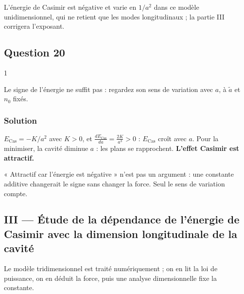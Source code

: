 \documentclass[11pt,a4paper]{article}
\newcommand{\equationajustee}[1]{%
  \sbox{\boiteequation}{$\displaystyle #1$}%
  \ifdim\wd\boiteequation>\linewidth
    \[\resizebox{\linewidth}{!}{\usebox{\boiteequation}}\]%
  \else
    \[#1\]%
  \fi}
\begin{document}
\equationajustee{\boxed{E_{\mathrm{Cas}}\simeq-\frac{\pi\hbar c\,\tilde a\,n_0^2}{4a^2}}}

L'énergie de Casimir est négative et varie en \(1/a^2\) dans ce modèle unidimensionnel, qui ne retient que les modes longitudinaux ; la partie III corrigera l'exposant.

\hypertarget{question-20}{%
\subsection{Question 20}\label{question-20}}

\begin{indication}{1}

Le signe de l'énergie ne suffit pas : regardez son sens de variation avec \(a\), à \(\tilde a\) et \(n_0\) fixés.

\end{indication}

\hypertarget{solution-19}{%
\subsubsection{Solution}\label{solution-19}}

\(E_{\mathrm{Cas}}=-K/a^2\) avec \(K>0\), et \(\frac{dE_{\mathrm{Cas}}}{da}=\frac{2K}{a^3}>0\) : \(E_{\mathrm{Cas}}\) croît avec \(a\). Pour la minimiser, la cavité diminue \(a\) : les plans se rapprochent. \textbf{L'effet Casimir est attractif.}

\begin{piege}

« Attractif car l'énergie est négative » n'est pas un argument : une constante additive changerait le signe sans changer la force. Seul le sens de variation compte.

\end{piege}

\hypertarget{iii-uxe9tude-de-la-duxe9pendance-de-luxe9nergie-de-casimir-avec-la-dimension-longitudinale-de-la-cavituxe9}{%
\subsection{III --- Étude de la dépendance de l'énergie de Casimir avec la dimension longitudinale de la cavité}\label{iii-uxe9tude-de-la-duxe9pendance-de-luxe9nergie-de-casimir-avec-la-dimension-longitudinale-de-la-cavituxe9}}

Le modèle tridimensionnel est traité numériquement ; on en lit la loi de puissance, on en déduit la force, puis une analyse dimensionnelle fixe la constante.
\end{document}
